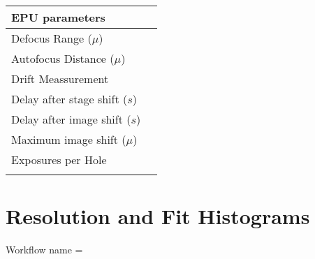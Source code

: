 \documentclass[12pt,a4paper]{article}
\begin{document}
%
  \hspace{1cm}
%
\begin{tabulary}{\linewidth}{L L}
  \\\hline
  EPU parameters &  \\\hline
  Defocus Range ($\mu$)&  \\\hline
  Autofocus Distance ($\mu$) & 
       \\\hline
  Drift Meassurement  &
       \\\hline %
  Delay after stage shift ($s$) & 
       \\\hline
  Delay after image shift ($s$) &
       \\\hline
  Maximum image shift ($\mu$) &
       \\\hline
  Exposures per Hole&
       \\\hline
      &\\
\end{tabulary}

\newpage
\section*{Resolution and Fit Histograms}

Workflow name = 
\end{document}
